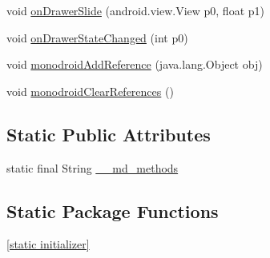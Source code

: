\begin{CompactItemize}
void \hyperlink{classmd5270abb39e60627f0f200893b490a1ade_1_1_master_detail_page_renderer_2b686422ecd14425a2f7e82787bee6c5}{onDrawerSlide} (android.view.View p0, float p1)
\item 
void \hyperlink{classmd5270abb39e60627f0f200893b490a1ade_1_1_master_detail_page_renderer_7b71dfbad27df2ecd675d05527840364}{onDrawerStateChanged} (int p0)
\item 
void \hyperlink{classmd5270abb39e60627f0f200893b490a1ade_1_1_master_detail_page_renderer_b2fa5ebe17fc669eac3c6d47a4fb2e0a}{monodroidAddReference} (java.lang.Object obj)
\item 
void \hyperlink{classmd5270abb39e60627f0f200893b490a1ade_1_1_master_detail_page_renderer_147e9c7ff151c01ebef6fade3b8600d8}{monodroidClearReferences} ()
\end{CompactItemize}
\subsection*{Static Public Attributes}
\begin{CompactItemize}
\item 
static final String \hyperlink{classmd5270abb39e60627f0f200893b490a1ade_1_1_master_detail_page_renderer_6531570f30e058588a00d29aa7c87230}{\_\-\_\-md\_\-methods}
\end{CompactItemize}
\subsection*{Static Package Functions}
\begin{CompactItemize}
\item 
\hyperlink{classmd5270abb39e60627f0f200893b490a1ade_1_1_master_detail_page_renderer_402d8be6c28d842987be8bd65c3b3021}{\mbox{[}static initializer\mbox{]}}
\end{CompactItemize}
